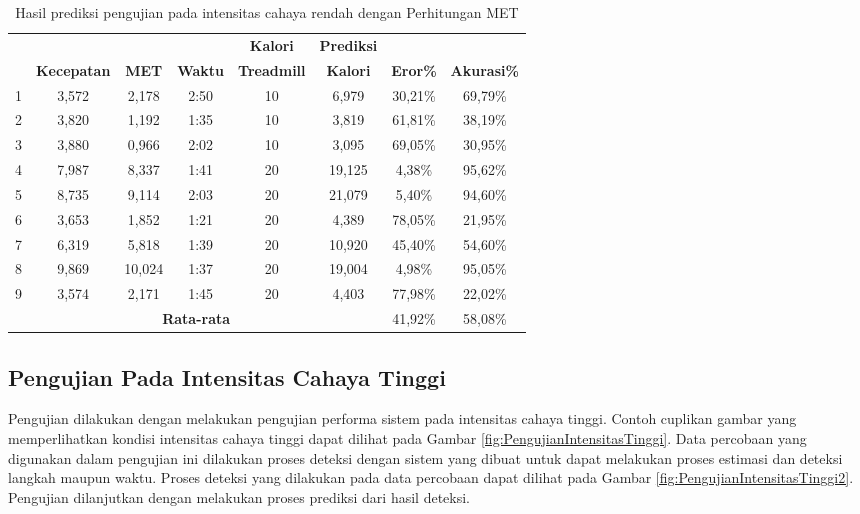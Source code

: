 \begin{longtable}{|c|c|c|c|c|c|c|c|}
  \caption{Hasil prediksi pengujian pada intensitas cahaya rendah dengan Perhitungan MET}
  \label{tb:PengujianIntensitasRendahAnalisaPrediksiPerhitungan}                                   \\
  \hline
  \rowcolor[HTML]{C0C0C0}
  & & & & \textbf{Kalori} & \textbf{Prediksi} & & \\
  \rowcolor[HTML]{C0C0C0}
  \multirow{-2}{*}{\textbf{Percobaan}} & \multirow{-2}{*}{\textbf{Kecepatan}} & \multirow{-2}{*}{\textbf{MET}} & \multirow{-2}{*}{\textbf{Waktu}} & \textbf{Treadmill} & \textbf{Kalori} & \multirow{-2}{*}{\textbf{Eror\%}} & \multirow{-2}{*}{\textbf{Akurasi\%}} \\
  \hline
  1   & 3,572   & 2,178    & 2:50    & 10   & 6,979    & 30,21\%     & 69,79\%   \\
  \hline
  2   & 3,820   & 1,192    & 1:35    & 10   & 3,819    & 61,81\%     & 38,19\%   \\
  \hline
  3   & 3,880   & 0,966    & 2:02    & 10   & 3,095    & 69,05\%     & 30,95\%   \\
  \hline
  4   & 7,987   & 8,337    & 1:41    & 20   & 19,125   & 4,38\%      & 95,62\%   \\
  \hline
  5   & 8,735   & 9,114    & 2:03    & 20   & 21,079   & 5,40\%      & 94,60\%   \\
  \hline
  6   & 3,653   & 1,852    & 1:21    & 20   & 4,389    & 78,05\%     & 21,95\%   \\
  \hline
  7   & 6,319   & 5,818    & 1:39    & 20   & 10,920   & 45,40\%     & 54,60\%   \\
  \hline
  8   & 9,869   & 10,024   & 1:37    & 20   & 19,004   & 4,98\%      & 95,05\%   \\
  \hline
  9   & 3,574   & 2,171    & 1:45    & 20   & 4,403    & 77,98\%     & 22,02\%   \\
  \hline

  \multicolumn{6}{|c|}{\textbf{Rata-rata}} & 41,92\% & 58,08\%  \\
  \hline
\end{longtable}


\subsection{Pengujian Pada Intensitas Cahaya Tinggi}
\label{subsec:PengujianIntensitasTinggi}

Pengujian dilakukan dengan melakukan pengujian performa sistem pada intensitas cahaya tinggi. Contoh cuplikan gambar yang memperlihatkan kondisi intensitas cahaya tinggi dapat dilihat pada Gambar \ref{fig:PengujianIntensitasTinggi}. Data percobaan yang digunakan dalam pengujian ini dilakukan proses deteksi dengan sistem yang dibuat untuk dapat melakukan proses estimasi dan deteksi langkah maupun waktu. Proses deteksi yang dilakukan pada data percobaan dapat dilihat pada Gambar \ref{fig:PengujianIntensitasTinggi2}. Pengujian dilanjutkan dengan melakukan proses prediksi dari hasil deteksi.

